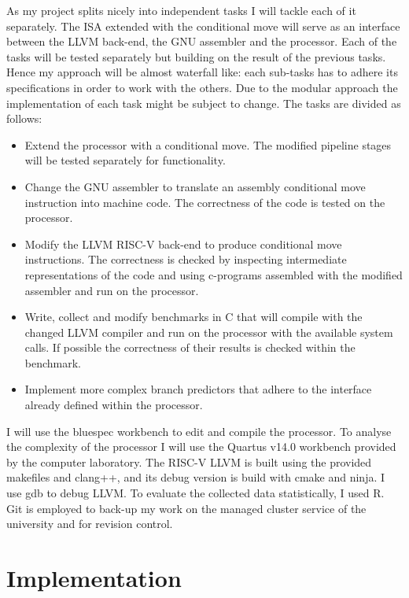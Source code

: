 \documentclass[12pt,twoside,notitlepage]{report}
\begin{document}
As my project splits nicely into independent tasks I will tackle each of it separately. The \gls{ISA} extended with the conditional move will serve as an interface between the LLVM back-end, the GNU assembler and the processor. Each of the tasks will be tested separately but building on the result of the previous tasks. Hence my approach will be almost waterfall like: each sub-tasks has to adhere its specifications in order to work with the others. Due to the modular approach the implementation of each task might be subject to change. The tasks are divided as follows:
\begin{itemize}
\item{} Extend the processor with a conditional move. The modified pipeline stages will be tested separately for functionality.

\item{} Change the GNU assembler to translate an assembly conditional move instruction into machine code. The correctness of the code is tested on the processor.

\item{} Modify the LLVM RISC-V back-end to produce conditional move instructions. The correctness is checked by inspecting intermediate representations of the code and using c-programs assembled with the modified assembler and run on the processor.

\item{} Write, collect and modify benchmarks in C that will compile with the changed LLVM compiler and run on the processor with the available system calls. If possible the correctness of their results is checked within the benchmark.

\item{} Implement more complex branch predictors that adhere to the interface already defined within the processor.
\end{itemize}

I will use the bluespec workbench to edit and compile the processor. To analyse the complexity of the processor I will use the Quartus v14.0 workbench provided by the computer laboratory. 
The RISC-V LLVM is built using the provided makefiles and clang++, and its debug version is build with cmake and ninja. I use gdb to debug LLVM. 
To evaluate the collected data statistically, I used R.
Git is employed to back-up my work on the managed cluster service of the university and for revision control.

\cleardoublepage


\chapter{Implementation}
\end{document}
